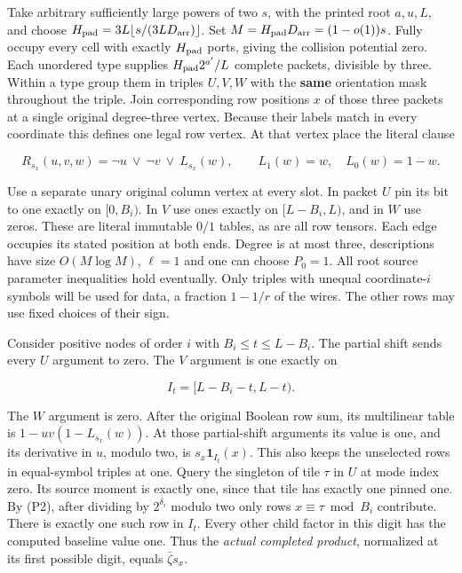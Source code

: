 \documentclass[11pt,a4paper]{article}
\begin{document}
Take arbitrary sufficiently large powers of two \(s\), with the printed
root \(a,u,L\), and choose
\(H_{\rm pad}=3L\lfloor s/(3L D_{\rm arr})\rfloor\). Set
\(M=H_{\rm pad}D_{\rm arr}=(1-o(1))s\). Fully occupy every cell with
exactly \(H_{\rm pad}\) ports, giving the collision potential zero. Each
unordered type supplies \(H_{\rm pad}2^{a'}/L\) complete packets,
divisible by three. Within a type group them in triples \(U,V,W\) with
the \textbf{same} orientation mask throughout the triple. Join
corresponding row positions \(x\) of those three packets at a single
original degree-three vertex. Because their labels match in every
coordinate this defines one legal row vertex. At that vertex place the
literal clause

\[
       R_{s_x}(u,v,w)=\neg u\ \lor\ \neg v\ \lor\ L_{s_x}(w),
       \qquad L_1(w)=w,\quad L_0(w)=1-w .
\]

Use a separate unary original column vertex at every slot. In packet
\(U\) pin its bit to one exactly on \([0,B_i)\). In \(V\) use ones
exactly on \([L-B_i,L)\), and in \(W\) use zeros. These are literal
immutable \(0/1\) tables, as are all row tensors. Each edge occupies its
stated position at both ends. Degree is at most three, descriptions have
size \(O(M\log M)\), \(\ell=1\) and one can choose \(P_0=1\). All root
source parameter inequalities hold eventually. Only triples with unequal
coordinate-\(i\) symbols will be used for data, a fraction \(1-1/r\) of
the wires. The other rows may use fixed choices of their sign.

Consider positive nodes of order \(i\) with \(B_i\le t\le L-B_i\). The
partial shift sends every \(U\) argument to zero. The \(V\) argument is
one exactly on

\[
       I_t=[L-B_i-t,L-t).
\]

The \(W\) argument is zero. After the original Boolean row sum, its
multilinear table is \(1-uv(1-L_{s_x}(w))\). At those partial-shift
arguments its value is one, and its derivative in \(u\), modulo two, is
\(s_x\mathbf1_{I_t}(x)\). This also keeps the unselected rows in
equal-symbol triples at one. Query the singleton of tile \(\tau\) in
\(U\) at mode index zero. Its source moment is exactly one, since that
tile has exactly one pinned one. By (P2), after dividing by
\(2^{\delta_i}\) modulo two only rows \(x\equiv\tau\bmod B_i\)
contribute. There is exactly one such row in \(I_t\). Every other child
factor in this digit has the computed baseline value one. Thus the
\emph{actual completed product}, normalized at its first possible digit,
equals \(\bar\zeta s_x\).
\end{document}
